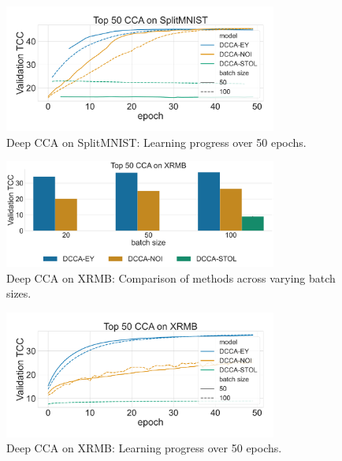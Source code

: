 \begin{figure}
    \centering
    \includegraphics[width=0.8\textwidth]{figures/DCCA/SplitMNIST_allbatchsizes_pcc}
    \caption{Deep CCA on SplitMNIST: Learning progress over 50 epochs.}
    \label{fig:lr_mnist}
\end{figure}

\begin{figure}
    \centering
    \includegraphics[width=0.8\textwidth]{figures/DCCA/XRMB_models_different_batch_sizes}
    \caption{Deep CCA on XRMB: Comparison of methods across varying batch sizes.}
    \label{fig:corr_xrmb}
\end{figure}

\begin{figure}
    \centering
    \includegraphics[width=0.8\textwidth]{figures/DCCA/XRMB_allbatchsizes_pcc}
    \caption{Deep CCA on XRMB: Learning progress over 50 epochs.}
    \label{fig:lr_xrmb}
\end{figure}

